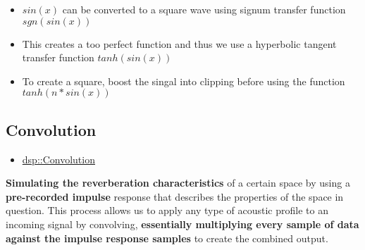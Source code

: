 \documentclass{article}
\begin{document}
	
	\begin{itemize}
		\item $sin(x)$ can be converted to a square wave using signum transfer function $sgn(sin(x))$
		\item This creates a too perfect function and thus we use a hyperbolic tangent transfer function $tanh(sin(x))$
		\item To create a square, boost the singal into clipping before using the function $tanh(n*sin(x))$
	\end{itemize}
	
	\subsection{Convolution}
	\begin{itemize}
		\item \href{https://docs.juce.com/master/classdsp_1_1Convolution.html}{dsp::Convolution}
	\end{itemize}
	\textbf{Simulating the reverberation characteristics} of a certain space by using a \textbf{pre-recorded impulse} response that describes the properties of the space in question. This process allows us to apply any type of acoustic profile to an incoming signal by convolving, \textbf{essentially multiplying every sample of data against the impulse response samples} to create the combined output.
	
	
\end{document}
